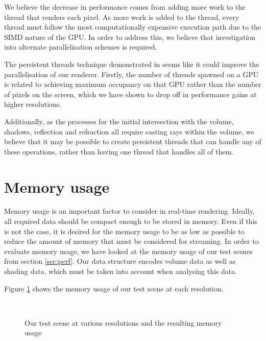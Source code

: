 We believe the decrease in performance comes from adding more work to the thread that renders each pixel. As more work is added to the thread, every thread must follow the most computationally expensive execution path due to the SIMD nature of the GPU. In order to address this, we believe that investigation into alternate parallelisation schemes is required.

The persistent threads technique demonstrated in \cite{aila2009hpg} seems like it could improve the parallelisation of our renderer. Firstly, the number of threads spawned on a GPU is related to achieving maximum occupancy on that GPU rather than the number of pixels on the screen, which we have shown to drop off in performance gains at higher resolutions. 

Additionally, as the processes for the initial intersection with the volume, shadows, reflection and refraction all require casting rays within the volume, we believe that it may be possible to create persistent threads that can handle any of these operations, rather than having one thread that handles all of them.

\section{Memory usage}
\label{sec:memusage}
Memory usage is an important factor to consider in real-time rendering. Ideally, all required data should be compact enough to be stored in memory. Even if this is not the case, it is desired for the memory usage to be as low as possible to reduce the amount of memory that must be considered for streaming. In order to evaluate memory usage, we have looked at the memory usage of our test scenes from section \ref{sec:perf}. Our data structure encodes volume data as well as shading data, which must be taken into account when analysing this data.

Figure \ref{fig:memory_usage} shows the memory usage of our test scene at each resolution.

\begin{figure}[H]
	\centering
	~
	\\

	\caption{Our test scene at various resolutions and the resulting memory usage}
	\label{fig:memory_usage}
\end{figure}


